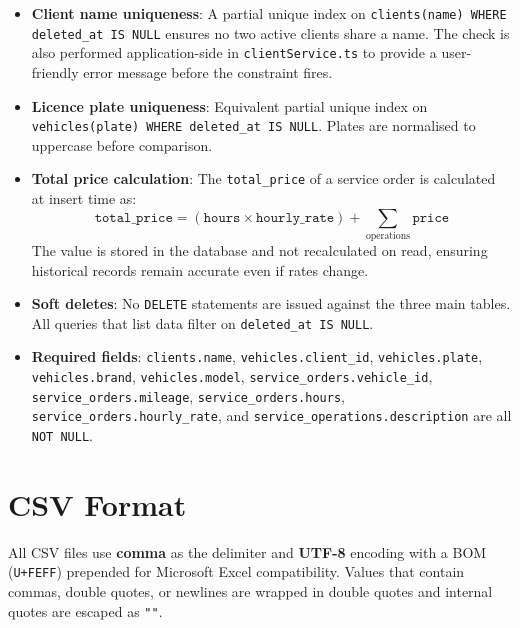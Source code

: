 \documentclass[12pt, a4paper]{report}
\begin{document}
	\begin{itemize}
		\item \textbf{Client name uniqueness}: A partial unique index on
		      \texttt{clients(name) WHERE deleted\_at IS NULL} ensures no two
		      active clients share a name. The check is also performed
		      application-side in \texttt{clientService.ts} to provide a
		      user-friendly error message before the constraint fires.
		\item \textbf{Licence plate uniqueness}: Equivalent partial unique
		      index on \texttt{vehicles(plate) WHERE deleted\_at IS NULL}.
		      Plates are normalised to uppercase before comparison.
		\item \textbf{Total price calculation}: The \texttt{total\_price} of a
		      service order is calculated at insert time as:
		      \[
		        \texttt{total\_price} = (\texttt{hours} \times \texttt{hourly\_rate})
		        + \sum_{\text{operations}} \texttt{price}
		      \]
		      The value is stored in the database and not recalculated on read,
		      ensuring historical records remain accurate even if rates change.
		\item \textbf{Soft deletes}: No \texttt{DELETE} statements are issued
		      against the three main tables. All queries that list data filter
		      on \texttt{deleted\_at IS NULL}.
		\item \textbf{Required fields}: \texttt{clients.name},
		      \texttt{vehicles.client\_id}, \texttt{vehicles.plate},
		      \texttt{vehicles.brand}, \texttt{vehicles.model},
		      \texttt{service\_orders.vehicle\_id}, \texttt{service\_orders.mileage},
		      \texttt{service\_orders.hours}, \texttt{service\_orders.hourly\_rate},
		      and \texttt{service\_operations.description} are all \texttt{NOT NULL}.
	\end{itemize}

	\section{CSV Format}
	All CSV files use \textbf{comma} as the delimiter and \textbf{UTF-8} encoding
	with a BOM (\texttt{U+FEFF}) prepended for Microsoft Excel compatibility.
	Values that contain commas, double quotes, or newlines are wrapped in double
	quotes and internal quotes are escaped as \texttt{""}.
\end{document}
